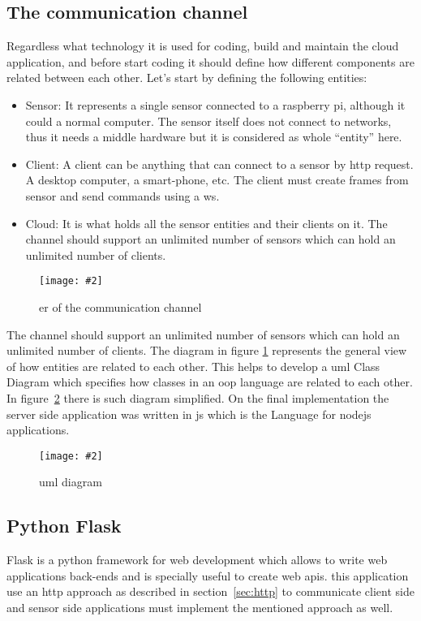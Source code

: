 \documentclass[hidelinks,11pt,a4paper,oneside,article]{memoir}
\newcommand{\putimage}[3][10] %
{
\begin{figure}[h]
	\centering
	\captionsetup{justification=centering}
	\texttt{[image: \#2]}
	\caption{#3}
	\label{fig:#2}
\end{figure}
}
\begin{document}
\subsection{The communication channel}\label{sec:the-communication-channel}
Regardless what technology it is used for coding, build and maintain the cloud application, and before start coding it should define how different components are related between each other.
Let’s start by defining the following entities:
\begin{itemize}
    \item Sensor: It represents a single sensor connected to a raspberry pi, although it could a normal computer. The sensor itself does not connect to networks, thus it needs a middle hardware but it is considered as whole “entity” here.
    \item Client: A client can be anything that can connect to a sensor by \gls{http} request. A desktop computer, a smart-phone, etc. The client must create frames from sensor and send commands using a \gls{ws}.
    \item Cloud: It is what holds all the sensor entities and their clients on it.
    The channel should support an unlimited number of sensors which can hold an unlimited number of clients.
\end{itemize}
\putimage[15]{channel-er}{\acrlong{er} of the communication channel}
The channel should support an unlimited number of sensors which can hold an unlimited number of clients.
The diagram in figure \ref{fig:channel-er} represents the general view of how entities are related to each other. This helps to develop a \gls{uml} Class Diagram which specifies how classes in an \gls{oop} language are related to each other. In figure~\ref{fig:channel-uml} there is such diagram simplified.
On the final implementation the server side application was written in \gls{js} which is the Language for \gls{nodejs} applications.
\putimage[15]{channel-uml}{\gls{uml} diagram}



\subsection{Python Flask}
Flask is a \gls{python} framework for web development which allows to write web applications back-ends and is specially useful to create web \gls{api}s. this application use an \gls{http} approach as described in section~\ref{sec:http} to communicate client side and sensor side applications must implement the mentioned approach as well.
\end{document}
